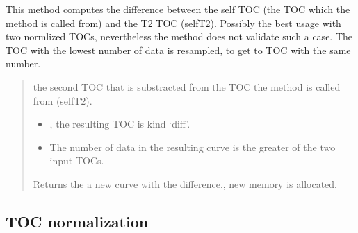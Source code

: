 \documentclass[letterpaper,10pt,english]{sphinxmanual}
\begin{document}
\begin{fulllineitems}
\label{\detokenize{usage:ootoc.TOC.diff}}
\pysigstartsignatures
{}
\pysigstopsignatures
\sphinxAtStartPar
This method computes the difference between the self TOC  (the TOC which the method is called from) and the T2 TOC (self\sphinxhyphen{}T2). Possibly the best usage with two normlized TOCs, nevertheless the method does not validate such a case.
The TOC with the lowest number of data is resampled, to get to TOC with the same number.
\begin{quote}\begin{description}
\sphinxAtStartPar
{} \textendash{} the second TOC that is substracted from the TOC the method is called from (self\sphinxhyphen{}T2).

\begin{itemize}
\item {} 
\sphinxAtStartPar
{} \textendash{} , the resulting TOC is kind ‘diff’.

\item {} 
\sphinxAtStartPar
{} \textendash{} The number of data in the resulting curve is the greater of the two input TOCs.

\end{itemize}

\sphinxAtStartPar
Returns the a new curve with the difference., new memory is allocated.

\sphinxAtStartPar
{}

\end{description}\end{quote}

\end{fulllineitems}



\subsection{TOC normalization}
\label{\detokenize{usage:toc-normalization}}
\end{document}
